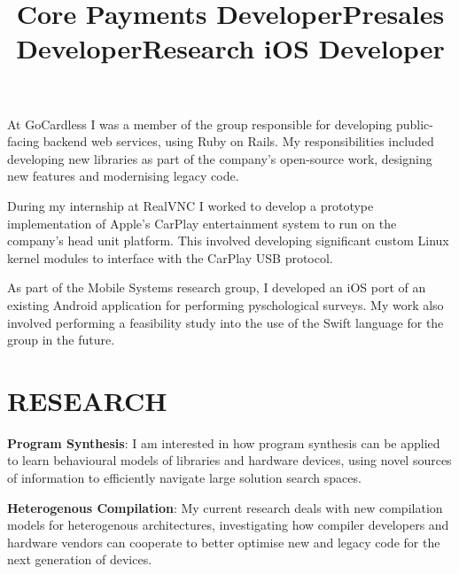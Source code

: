 \documentclass[margin]{res}
\begin{document}
\begin{resume}
\title{\textbf{Core Payments Developer}}
\begin{position}
At GoCardless I was a member of the group responsible for developing
public-facing backend web services, using Ruby on Rails. My responsibilities
included developing new libraries as part of the company's open-source work,
designing new features and modernising legacy code.
\end{position}

\title{\textbf{Presales Developer}}
\begin{position}
During my internship at RealVNC I worked to develop a prototype implementation
of Apple's CarPlay entertainment system to run on the company's head unit
platform. This involved developing significant custom Linux kernel modules to interface with
the CarPlay USB protocol.
\end{position}

\title{\textbf{Research iOS Developer}}
\begin{position}
As part of the Mobile Systems research group, I developed an iOS port of an
existing Android application for performing pyschological surveys. My work also
involved performing a feasibility study into the use of the Swift language for
the group in the future.
\end{position}

\section{RESEARCH}

\par
\textbf{Program Synthesis}: I am interested in how program synthesis can be
applied to learn behavioural models of libraries and hardware devices, using
novel sources of information to efficiently navigate large solution search spaces.

\par
\textbf{Heterogenous Compilation}: My current research deals with new
compilation models for heterogenous architectures, investigating how compiler
developers and hardware vendors can cooperate to better optimise new and legacy
code for the next generation of devices.


\end{resume}
\end{document}
